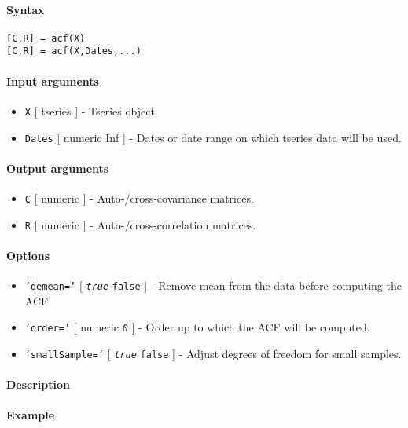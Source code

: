 


	\paragraph{Syntax}

\begin{verbatim}
[C,R] = acf(X)
[C,R] = acf(X,Dates,...)
\end{verbatim}

\paragraph{Input arguments}

\begin{itemize}
\item
  \texttt{X} {[} tseries {]} - Tseries object.
\item
  \texttt{Dates} {[} numeric \textbar{} Inf {]} - Dates or date range on
  which tseries data will be used.
\end{itemize}

\paragraph{Output arguments}

\begin{itemize}
\item
  \texttt{C} {[} numeric {]} - Auto-/cross-covariance matrices.
\item
  \texttt{R} {[} numeric {]} - Auto-/cross-correlation matrices.
\end{itemize}

\paragraph{Options}

\begin{itemize}
\item
  \texttt{'demean='} {[} \emph{\texttt{true}} \textbar{} \texttt{false}
  {]} - Remove mean from the data before computing the ACF.
\item
  \texttt{'order='} {[} numeric \textbar{} \emph{\texttt{0}} {]} - Order
  up to which the ACF will be computed.
\item
  \texttt{'smallSample='} {[} \emph{\texttt{true}} \textbar{}
  \texttt{false} {]} - Adjust degrees of freedom for small samples.
\end{itemize}

\paragraph{Description}

\paragraph{Example}


